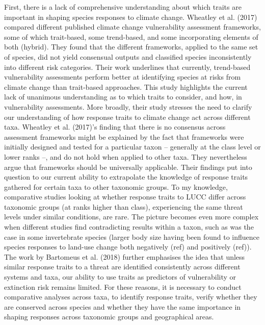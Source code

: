 First, there is a lack of comprehensive understanding about which traits are important in shaping species responses to climate change. Wheatley et al. (2017) compared different published climate change vulnerability assessment frameworks, some of which trait-based, some trend-based, and some incorporating elements of both (hybrid). They found that the different frameworks, applied to the same set of species, did not yield consensual outputs and classified species inconsistently into different risk categories. Their work underlines that currently, trend-based vulnerability assessments perform better at identifying species at risks from climate change than trait-based approaches. This study highlights the current lack of unanimous understanding as to which traits to consider, and how, in vulnerability assessments. More broadly, their study stresses the need to clarify our understanding of how response traits to climate change act across different taxa. Wheatley et al. (2017)’s finding that there is no consensus across assessment frameworks might be explained by the fact that frameworks were initially designed and tested for a particular taxon – generally at the class level or lower ranks –, and do not hold when applied to other taxa. They nevertheless argue that frameworks should be universally applicable. Their findings put into question to our current ability to extrapolate the knowledge of response traits gathered for certain taxa to other taxonomic groups. To my knowledge, comparative studies looking at whether response traits to LUCC differ across taxonomic groups (at ranks higher than class), experiencing the same threat levels under similar conditions, are rare. The picture becomes even more complex when different studies find contradicting results within a taxon, such as was the case in some invertebrate species (larger body size having been found to influence species responses to land-use change both negatively (ref) and positively (ref)). The work by Bartomeus et al. (2018) further emphasises the idea that unless similar response traits to a threat are identified consistently across different systems and taxa, our ability to use traits as predictors of vulnerability or extinction risk remains limited. For these reasons, it is necessary to conduct comparative analyses across taxa, to identify response traits, verify whether they are conserved across species and whether they have the same importance in shaping responses across taxonomic groups and geographical areas. 
